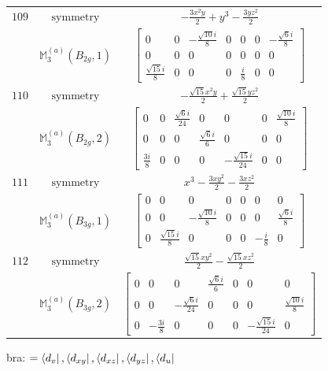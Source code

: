 \documentclass[fleqn,8pt,landscape]{jsarticle}
\begin{document}
\begin{longtable}{ccc}
$ 109 $ & $ \text{symmetry} $ & $ - \frac{3 x^{2} y}{2} + y^{3} - \frac{3 y z^{2}}{2} $ \\
$  $ & $ \mathbb{M}_{3}^{(a)}(B_{2g},1) $ & $ \begin{bmatrix} 0 & 0 & - \frac{\sqrt{10} i}{8} & 0 & 0 & 0 & - \frac{\sqrt{6} i}{8} \\ 0 & 0 & 0 & 0 & 0 & 0 & 0 \\ \frac{\sqrt{15} i}{8} & 0 & 0 & 0 & \frac{i}{8} & 0 & 0 \end{bmatrix} $ \\ \hline
$ 110 $ & $ \text{symmetry} $ & $ - \frac{\sqrt{15} x^{2} y}{2} + \frac{\sqrt{15} y z^{2}}{2} $ \\
$  $ & $ \mathbb{M}_{3}^{(a)}(B_{2g},2) $ & $ \begin{bmatrix} 0 & 0 & \frac{\sqrt{6} i}{24} & 0 & 0 & 0 & \frac{\sqrt{10} i}{8} \\ 0 & 0 & 0 & \frac{\sqrt{6} i}{6} & 0 & 0 & 0 \\ \frac{3 i}{8} & 0 & 0 & 0 & - \frac{\sqrt{15} i}{24} & 0 & 0 \end{bmatrix} $ \\ \hline
$ 111 $ & $ \text{symmetry} $ & $ x^{3} - \frac{3 x y^{2}}{2} - \frac{3 x z^{2}}{2} $ \\
$  $ & $ \mathbb{M}_{3}^{(a)}(B_{3g},1) $ & $ \begin{bmatrix} 0 & 0 & 0 & 0 & 0 & 0 & 0 \\ 0 & 0 & - \frac{\sqrt{10} i}{8} & 0 & 0 & 0 & \frac{\sqrt{6} i}{8} \\ 0 & \frac{\sqrt{15} i}{8} & 0 & 0 & 0 & - \frac{i}{8} & 0 \end{bmatrix} $ \\ \hline
$ 112 $ & $ \text{symmetry} $ & $ \frac{\sqrt{15} x y^{2}}{2} - \frac{\sqrt{15} x z^{2}}{2} $ \\
$  $ & $ \mathbb{M}_{3}^{(a)}(B_{3g},2) $ & $ \begin{bmatrix} 0 & 0 & 0 & \frac{\sqrt{6} i}{6} & 0 & 0 & 0 \\ 0 & 0 & - \frac{\sqrt{6} i}{24} & 0 & 0 & 0 & \frac{\sqrt{10} i}{8} \\ 0 & - \frac{3 i}{8} & 0 & 0 & 0 & - \frac{\sqrt{15} i}{24} & 0 \end{bmatrix} $ \\ \hline
\end{longtable}
bra: $=\bra{d_{v}}, \bra{d_{xy}}, \bra{d_{xz}}, \bra{d_{yz}}, \bra{d_{u}}$
\end{document}
